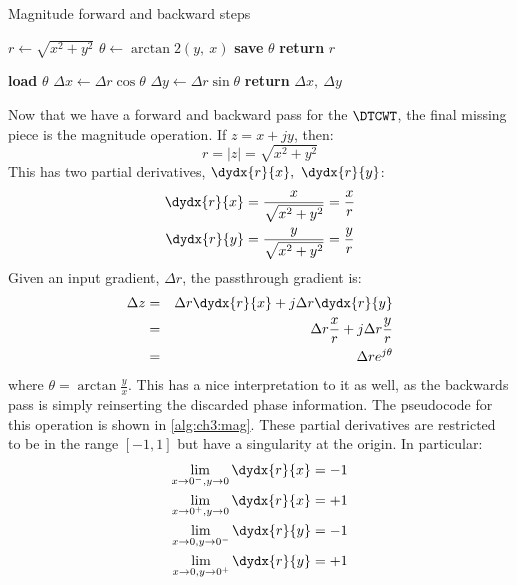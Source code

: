 \begin{algorithm}[tb]
\caption{Magnitude forward and backward steps}\label{alg:ch3:mag}
\begin{algorithmic}[1]
  \State $r \gets \sqrt{x^2 + y^2}$
  \State $\theta \gets \arctan2(y,\ x)$ 
  \State \textbf{save} $\theta$
  \State \textbf{return} $r$
\EndFunction
\end{algorithmic}\vspace{10pt}
\begin{algorithmic}[1]
  \State \textbf{load} $\theta$
  \State $\Delta x \gets \Delta r \cos{\theta}$ 
  \State $\Delta y \gets \Delta r \sin{\theta}$ 
  \State \textbf{return} $\Delta x,\ \Delta y$
\EndFunction
\end{algorithmic}
\end{algorithm}
Now that we have a forward and backward pass for the $\DTCWT$, the final missing
piece is the magnitude operation. If $z = x + jy$, then:
%
\begin{equation}
  r = |z| =  \sqrt{x^2 + y^2}
\end{equation}
%
This has two partial derivatives, $\dydx{r}{x},\ \dydx{r}{y}$:
\begin{align}
  \dydx{r}{x} & =  \frac{x}{\sqrt{x^2 + y^2}} = \frac{x}{r}\\
  \dydx{r}{y} & =  \frac{y}{\sqrt{x^2 + y^2}} = \frac{y}{r}
\end{align}
Given an input gradient, $\Delta r$, the passthrough gradient is:
\begin{eqnarray}
  \Delta z & = & \Delta r \dydx{r}{x} + j\Delta r \dydx{r}{y} \\
           &= & \Delta r \frac{x}{r} + j\Delta r \frac{y}{r} \\
           &=& \Delta r e^{j\theta}
\end{eqnarray}
where $\theta = \arctan{\frac{y}{x}}$. This has a nice interpretation to it as
well, as the backwards pass is simply reinserting the discarded phase
information. The pseudocode for this operation is shown in
\autoref{alg:ch3:mag}.
%
These partial derivatives are restricted to be in the range $[-1, 1]$ but have a singularity at the origin.
In particular:
\begin{align}
  \lim_{x\rightarrow 0^{-},y\rightarrow 0}  \dydx{r}{x} &= -1 \\
  \lim_{x\rightarrow 0^{+},y\rightarrow 0}  \dydx{r}{x} &= +1 \\
  \lim_{x\rightarrow 0,y\rightarrow 0^{-}}  \dydx{r}{y} &= -1 \\
  \lim_{x\rightarrow 0,y\rightarrow 0^{+}}  \dydx{r}{y} &= +1
\end{align}

